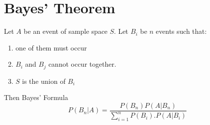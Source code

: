 \documentclass[12pt]{article}
\theoremstyle{definition}
\begin{document}
\section{Bayes' Theorem}
Let $A$ be an event of sample space $S$.
Let $B_i$ be $n$ events such that:
\begin{enumerate}
    \item one of them must occur 
    \item $B_i$ and $B_j$ cannot occur together.
    \item $S$ is the union of $B_i$
\end{enumerate}
Then \textsf{Bayes' Formula} 
\[
    \displaystyle P(B_n|A) = \frac{P(B_n)P(A|B_n)}{\sum_{i = 1}^n P(B_i).P(A|B_i)}
\]
\end{document}
